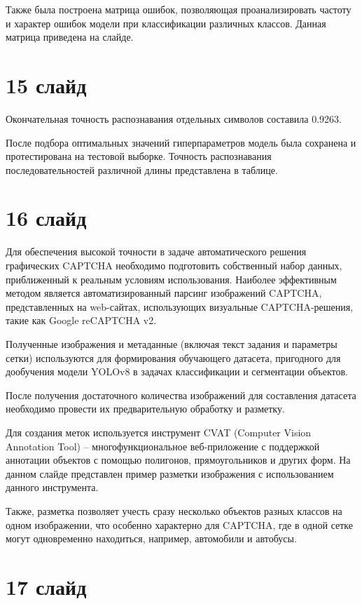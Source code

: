\documentclass{altsu-report}
\begin{document}
Также была построена матрица ошибок, позволяющая проанализировать частоту и 
характер ошибок модели при классификации различных классов. Данная матрица 
приведена на слайде.

\section*{15 слайд}

Окончательная точность распознавания отдельных символов составила 0.9263.

После подбора оптимальных значений гиперпараметров модель была сохранена и 
протестирована на тестовой выборке. Точность распознавания последовательностей 
различной длины представлена в таблице.

\section*{16 слайд}

Для обеспечения высокой точности в задаче автоматического решения графических 
CAPTCHA необходимо подготовить собственный набор данных, приближенный к реальным 
условиям использования. Наиболее эффективным методом является автоматизированный 
парсинг изображений CAPTCHA, представленных на web-сайтах, использующих 
визуальные CAPTCHA-решения, такие как Google reCAPTCHA v2.

Полученные изображения и метаданные (включая текст задания и параметры сетки) 
используются для формирования обучающего датасета, пригодного для дообучения 
модели YOLOv8 в задачах классификации и сегментации объектов.

После получения достаточного количества изображений для составления датасета 
необходимо провести их предварительную обработку и разметку.

Для создания меток используется инструмент CVAT (Computer Vision Annotation Tool) 
-- многофункциональное веб-приложение с поддержкой аннотации объектов с помощью 
полигонов, прямоугольников и других форм. На данном слайде представлен пример 
разметки изображения с использованием данного инструмента.

Также, разметка позволяет учесть сразу несколько объектов разных классов на 
одном изображении, что особенно характерно для CAPTCHA, где в одной сетке могут 
одновременно находиться, например, автомобили и автобусы.

\section*{17 слайд}
\end{document}
